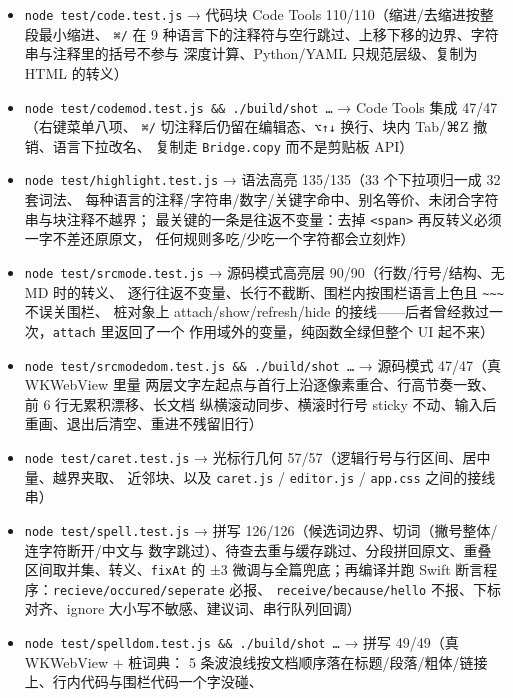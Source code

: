 \documentclass[11pt,a4paper]{ctexart}
\begin{document}
\begin{itemize}
\texttt{cmd/ext/name/dir/content} 载荷、成功后「在 Finder 中显示」、缺 \texttt{\{out\}} 被拦截、
命令不存在的错误提示、取消保存面板、空文档不出命令、清空后菜单不再显示自定义组）
\item \texttt{node test/code.test.js} → 代码块 Code Tools 110/110（缩进/去缩进按整段最小缩进、
\texttt{⌘/} 在 9 种语言下的注释符与空行跳过、上移下移的边界、字符串与注释里的括号不参与
深度计算、Python/YAML 只规范层级、复制为 HTML 的转义）
\item \texttt{node test/codemod.test.js \&\& ./build/shot …} → Code Tools 集成 47/47（右键菜单八项、
\texttt{⌘/} 切注释后仍留在编辑态、\texttt{⌥↑↓} 换行、块内 Tab/⌘Z 撤销、语言下拉改名、
复制走 \texttt{Bridge.copy} 而不是剪贴板 API）
\item \texttt{node test/highlight.test.js} → 语法高亮 135/135（33 个下拉项归一成 32 套词法、
每种语言的注释/字符串/数字/关键字命中、别名等价、未闭合字符串与块注释不越界；
最关键的一条是往返不变量：去掉 \texttt{\textless{}span\textgreater{}} 再反转义必须一字不差还原原文，
任何规则多吃/少吃一个字符都会立刻炸）
\item \texttt{node test/srcmode.test.js} → 源码模式高亮层 90/90（行数/行号/结构、无 MD 时的转义、
逐行往返不变量、长行不截断、围栏内按围栏语言上色且 \texttt{\textasciitilde{}\textasciitilde{}\textasciitilde{}} 不误关围栏、
桩对象上 attach/show/refresh/hide 的接线——后者曾经救过一次，\texttt{attach} 里返回了一个
作用域外的变量，纯函数全绿但整个 UI 起不来）
\item \texttt{node test/srcmodedom.test.js \&\& ./build/shot …} → 源码模式 47/47（真 WKWebView 里量
两层文字左起点与首行上沿逐像素重合、行高节奏一致、前 6 行无累积漂移、长文档
纵横滚动同步、横滚时行号 sticky 不动、输入后重画、退出后清空、重进不残留旧行）
\item \texttt{node test/caret.test.js} → 光标行几何 57/57（逻辑行号与行区间、居中量、越界夹取、
近邻块、以及 \texttt{caret.js} / \texttt{editor.js} / \texttt{app.css} 之间的接线串）
\item \texttt{node test/spell.test.js} → 拼写 126/126（候选词边界、切词（撇号整体/连字符断开/中文与
数字跳过）、待查去重与缓存跳过、分段拼回原文、重叠区间取并集、转义、\texttt{fixAt} 的
±3 微调与全篇兜底；再编译并跑 Swift 断言程序：\texttt{recieve/occured/seperate} 必报、
\texttt{receive/because/hello} 不报、下标对齐、ignore 大小写不敏感、建议词、串行队列回调）
\item \texttt{node test/spelldom.test.js \&\& ./build/shot …} → 拼写 49/49（真 WKWebView + 桩词典：
5 条波浪线按文档顺序落在标题/段落/粗体/链接上、行内代码与围栏代码一个字没碰、

\end{itemize}
\end{document}
